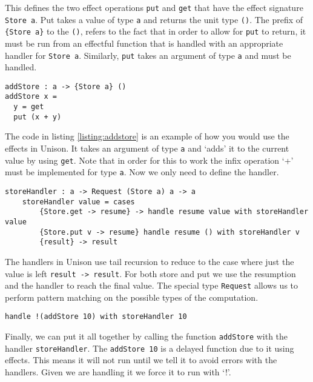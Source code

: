 \documentclass[logo,bsc,singlespacing,parskip]{infthesis}
\begin{document}
This defines the two effect operations \texttt{put} and \texttt{get} that have
the effect signature \texttt{Store a}. Put takes a value of type \texttt{a} and
returns the unit type \texttt{()}. The prefix of \texttt{\{Store a\}} to the
\texttt{()}, refers to the fact that in order to allow for \texttt{put} to
return, it must be run from an effectful function that is handled with an
appropriate handler for \texttt{Store a}. Similarly, \texttt{put} takes an
argument of type \texttt{a} and must be handled.

\begin{lstlisting}[caption={An example of an effectful function that uses the \texttt{Store} effect}]
addStore : a -> {Store a} ()
addStore x =
  y = get
  put (x + y)
\end{lstlisting}
\label{listing:addstore}

The code in listing \ref{listing:addstore} is an example of how you would use
the effects in Unison. It takes an argument of type \texttt{a} and `adds' it to
the current value by using \texttt{get}. Note that in order for this to work the
infix operation `+' must be implemented for type \texttt{a}. Now we only need to
define the handler.

\begin{lstlisting}[caption={The handler for the \texttt{Store} effect}]
    storeHandler : a -> Request (Store a) a -> a
    storeHandler value = cases
        {Store.get -> resume} -> handle resume value with storeHandler value
        {Store.put v -> resume} handle resume () with storeHandler v
        {result} -> result

\end{lstlisting}

The handlers in Unison use tail recursion to reduce to the case where just the
value is left \texttt{result -> result}. For both store and put we use the
resumption and the handler to reach the final value. The special type
\texttt{Request} allows us to perform pattern matching on the possible types of
the computation.

\begin{lstlisting}
handle !(addStore 10) with storeHandler 10
\end{lstlisting}

Finally, we can put it all together by calling the function \texttt{addStore}
with the handler \texttt{storeHandler}. The \texttt{addStore 10} is a delayed
function due to it using effects. This means it will not run until we tell it to
avoid errors with the handlers. Given we are handling it we force it to run with
`!'.
\end{document}
